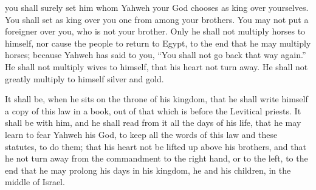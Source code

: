 {you shall surely set him whom Yahweh your God chooses as king over yourselves. You shall set as king over you one from among your brothers. You may not put a foreigner over you, who is not your brother.
Only he shall not multiply horses to himself, nor cause the people to return to Egypt, to the end that he may multiply horses; because Yahweh has said to you, “You shall not go back that way again.”
He shall not multiply wives to himself, that his heart not turn away. He shall not greatly multiply to himself silver and gold.
\par }{\PP {}It shall be, when he sits on the throne of his kingdom, that he shall write himself a copy of this law in a book, out of that which is before the Levitical priests.
It shall be with him, and he shall read from it all the days of his life, that he may learn to fear Yahweh his God, to keep all the words of this law and these statutes, to do them;
that his heart not be lifted up above his brothers, and that he not turn away from the commandment to the right hand, or to the left, to the end that he may prolong his days in his kingdom, he and his children, in the middle of Israel.

}
